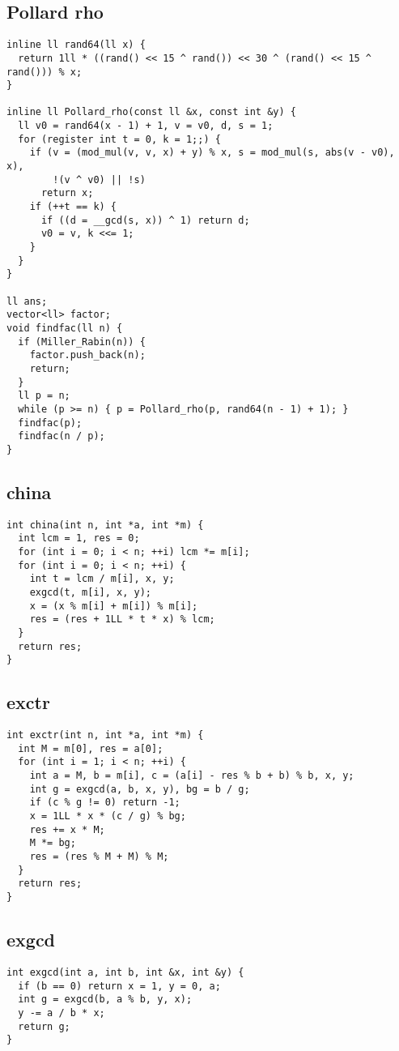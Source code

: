 \documentclass[twoside]{article}
\begin{document}
\subsection{Pollard rho}
\begin{lstlisting}
inline ll rand64(ll x) {
  return 1ll * ((rand() << 15 ^ rand()) << 30 ^ (rand() << 15 ^ rand())) % x;
}

inline ll Pollard_rho(const ll &x, const int &y) {
  ll v0 = rand64(x - 1) + 1, v = v0, d, s = 1;
  for (register int t = 0, k = 1;;) {
    if (v = (mod_mul(v, v, x) + y) % x, s = mod_mul(s, abs(v - v0), x),
        !(v ^ v0) || !s)
      return x;
    if (++t == k) {
      if ((d = __gcd(s, x)) ^ 1) return d;
      v0 = v, k <<= 1;
    }
  }
}

ll ans;
vector<ll> factor;
void findfac(ll n) {
  if (Miller_Rabin(n)) {
    factor.push_back(n);
    return;
  }
  ll p = n;
  while (p >= n) { p = Pollard_rho(p, rand64(n - 1) + 1); }
  findfac(p);
  findfac(n / p);
}

\end{lstlisting}
\subsection{china}
\begin{lstlisting}
int china(int n, int *a, int *m) {
  int lcm = 1, res = 0;
  for (int i = 0; i < n; ++i) lcm *= m[i];
  for (int i = 0; i < n; ++i) {
    int t = lcm / m[i], x, y;
    exgcd(t, m[i], x, y);
    x = (x % m[i] + m[i]) % m[i];
    res = (res + 1LL * t * x) % lcm;
  }
  return res;
}

\end{lstlisting}
\subsection{exctr}
\begin{lstlisting}
int exctr(int n, int *a, int *m) {
  int M = m[0], res = a[0];
  for (int i = 1; i < n; ++i) {
    int a = M, b = m[i], c = (a[i] - res % b + b) % b, x, y;
    int g = exgcd(a, b, x, y), bg = b / g;
    if (c % g != 0) return -1;
    x = 1LL * x * (c / g) % bg;
    res += x * M;
    M *= bg;
    res = (res % M + M) % M;
  }
  return res;
}

\end{lstlisting}
\subsection{exgcd}
\begin{lstlisting}
int exgcd(int a, int b, int &x, int &y) {
  if (b == 0) return x = 1, y = 0, a;
  int g = exgcd(b, a % b, y, x);
  y -= a / b * x;
  return g;
}

\end{lstlisting}
\end{document}
